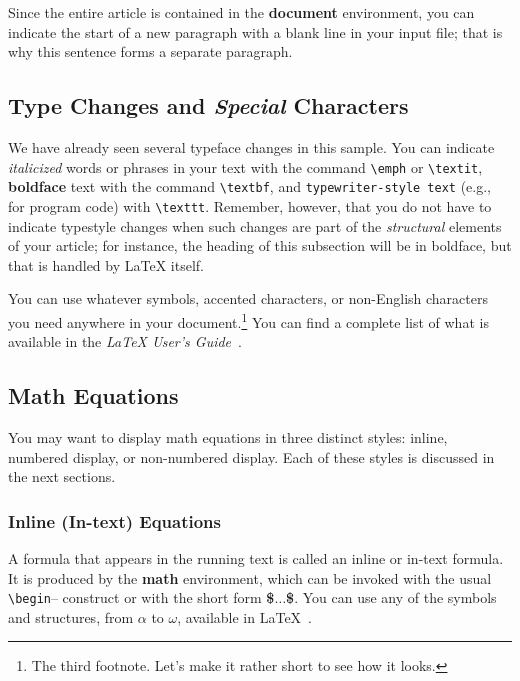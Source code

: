 \documentclass[sigconf]{acmart}
\begin{document}
Since the entire article is contained in the \textbf{document} environment,
you can indicate the start of a new paragraph with a blank line in your input
file; that is why this sentence forms a separate paragraph.

\subsection{Type Changes and \emph{Special} Characters}

We have already seen several typeface changes in this sample.  You can
indicate \emph{italicized} words or phrases in your text with the command
\texttt{\textbackslash{}emph} or \texttt{\textbackslash{}textit},
\textbf{boldface} text with the command \texttt{\textbackslash{}textbf}, and
\texttt{typewriter-style text} (e.g., for program code) with
\texttt{\textbackslash{}texttt}.  Remember, however, that you do not have to
indicate typestyle changes when such changes are part of the \emph{structural}
elements of your article; for instance, the heading of this subsection will be
in boldface, but that is handled by \LaTeX{} itself.

You can use whatever symbols, accented characters, or non-English characters
you need anywhere in your document.\footnote{The third footnote. Let's make it
rather short to see how it looks.}  You can find a complete list of what is
available in the \emph{\LaTeX{} User's Guide}~\cite{Lamport:LaTeX}.

\subsection{Math Equations}

You may want to display math equations in three distinct styles: inline,
numbered display, or non-numbered display.  Each of these styles is discussed
in the next sections.

\subsubsection{Inline (In-text) Equations}

A formula that appears in the running text is called an inline or in-text
formula.  It is produced by the \textbf{math} environment, which can be
invoked with the usual
\texttt{\textbackslash{}begin}-- construct or with
the short form \textbf{\$$\ldots$\$}.  You can use any of the symbols and
structures, from $\alpha$ to $\omega$, available in
\LaTeX~\cite{Lamport:LaTeX}.  
\end{document}

